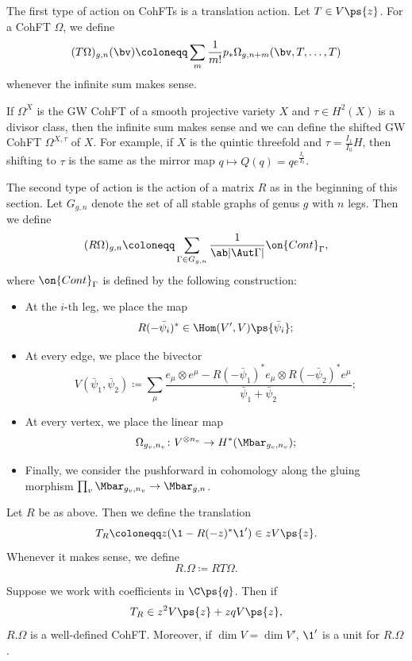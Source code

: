 The first type of action on CohFTs is a translation action. Let $T \in V\ps{z}$. For a CohFT $\Omega$, we define
\[ (T\Omega)_{g,n}(\bv) \coloneqq \sum_m \frac{1}{m!} p_* \Omega_{g,n+m}(\bv, T,\ldots,T) \]
whenever the infinite sum makes sense.

\begin{exm}
    If $\Omega^X$ is the GW CohFT of a smooth projective variety $X$ and $\tau \in H^2(X)$ is a divisor class, then the infinite sum makes sense and we can define the shifted GW CohFT $\Omega^{X,\tau}$ of $X$. For example, if $X$ is the quintic threefold and $\tau = \frac{I_1}{I_0} H$, then shifting to $\tau$ is the same as the mirror map $q \mapsto Q(q) = q e^{\frac{I_1}{I_0}}$.
\end{exm}

The second type of action is the action of a matrix $R$ as in the beginning of this section. Let $G_{g,n}$ denote the set of all stable graphs of genus $g$ with $n$ legs. Then we define
\[ (R\Omega)_{g,n} \coloneqq \sum_{\Gamma \in G_{g,n}} \frac{1}{\ab|\Aut \Gamma|} \on{Cont}_{\Gamma}, \]
where $\on{Cont}_{\Gamma}$ is defined by the following construction:
\begin{itemize}
    \item At the $i$-th leg, we place the map 
        \[ R(-\bar{\psi}_i)^* \in \Hom(V',V) \ps{\bar{\psi}_i}; \]
    \item At every edge, we place the bivector
        \[ V(\bar{\psi}_1, \bar{\psi}_2) \coloneqq \sum_{\mu} \frac{e_{\mu} \otimes e^{\mu} - R(-\bar{\psi}_1)^* e_{\mu} \otimes R(-\bar{\psi}_2)^* e^{\mu}}{\bar{\psi}_1 + \bar{\psi}_2}; \]
    \item At every vertex, we place the linear map
        \[ \Omega_{g_v, n_v} \colon V^{\otimes n_v} \to H^*(\Mbar_{g_v, n_v}); \]
    \item Finally, we consider the pushforward in cohomology along the gluing morphism $\prod_v \Mbar_{g_v, n_v} \to \Mbar_{g,n}$.
\end{itemize}

\begin{defn}
    Let $R$ be as above. Then we define the translation
    \[ T_R \coloneqq z (\1 - R(-z)^* \1') \in z V\ps{z}. \]
    Whenever it makes sense, we define
    \[ R.\Omega \coloneqq RT\Omega. \]
\end{defn}

\begin{thm}
    Suppose we work with coefficients in $\C\ps{q}$. Then if
    \[ T_R \in z^2 V \ps{z} + zq V \ps{z}, \]
    $R.\Omega$ is a well-defined CohFT. Moreover, if $\dim V = \dim V'$, $\1'$ is a unit for $R.\Omega$.
\end{thm}

